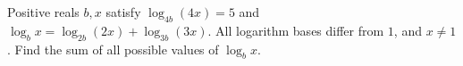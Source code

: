 Positive reals $b,x$ satisfy $\log_{4b}(4x)=5$ and $\log_bx=\log_{2b}(2x)+\log_{3b}(3x)$. All logarithm bases differ from $1$, and $x\ne1$. Find the sum of all possible values of $\log_bx$.
